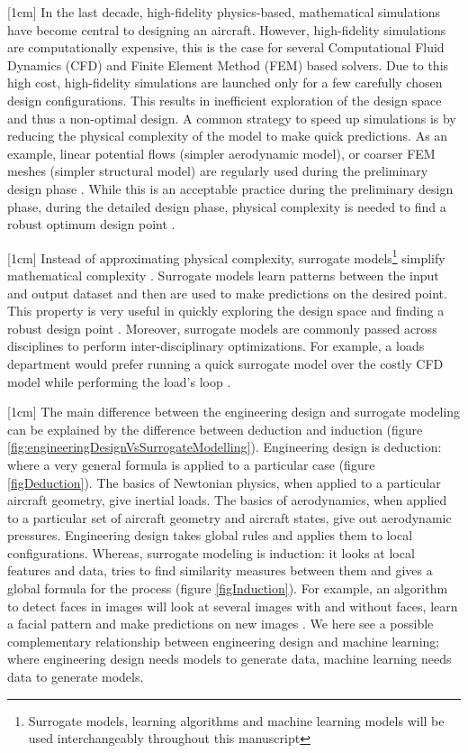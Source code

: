 [1cm]
In the last decade, high-fidelity physics-based, mathematical simulations have become central to designing an aircraft. However, high-fidelity simulations are computationally expensive, this is the case for several Computational Fluid Dynamics (CFD) and Finite Element Method (FEM) based solvers. Due to this high cost, high-fidelity simulations are launched only for a few carefully chosen design configurations. This results in inefficient exploration of the design space and thus a non-optimal design. A common strategy to speed up simulations is by reducing the physical complexity of the model to make quick predictions. As an example, linear potential flows (simpler aerodynamic model), or coarser FEM meshes (simpler structural model) are regularly used during the preliminary design phase \cite{cummings2015applied}. While this is an acceptable practice during the preliminary design phase, during the detailed design phase, physical complexity is needed to find a robust optimum design point \cite{raymer2012aircraft}.

[1cm]
Instead of approximating physical complexity, surrogate models\footnote{Surrogate models, learning algorithms and machine learning models will be used interchangeably throughout this manuscript} simplify mathematical complexity \cite{verveld2016reduced}. Surrogate models learn patterns between the input and output dataset and then are used to make predictions on the desired point. This property is very useful in quickly exploring the design space and finding a robust design point \cite{forrester2008engineering}. Moreover, surrogate models are commonly passed across disciplines to perform inter-disciplinary optimizations. For example, a loads department would prefer running a quick surrogate model over the costly CFD model while performing the load's loop \cite{bartoliAIAA2017, bartoliAGILE2017}.  

[1cm]
The main difference between the engineering design and surrogate modeling can be explained by the difference between deduction and induction \cite{domingos2012few} (figure \ref{fig:engineeringDesignVsSurrogateModelling}). Engineering design is deduction: where a very general formula is applied to a particular case (figure \ref{figDeduction}). The basics of Newtonian physics, when applied to a particular aircraft geometry, give inertial loads. The basics of aerodynamics, when applied to a particular set of aircraft geometry and aircraft states, give out aerodynamic pressures. Engineering design takes global rules and applies them to local configurations. Whereas, surrogate modeling is induction: it looks at local features and data, tries to find similarity measures between them and gives a global formula for the process (figure \ref{figInduction}). For example, an algorithm to detect faces in images will look at several images with and without faces, learn a facial pattern and make predictions on new images \cite{marszalek2007semantic}. We here see a possible complementary relationship between engineering design and machine learning; where engineering design needs models to generate data, machine learning needs data to generate models.

